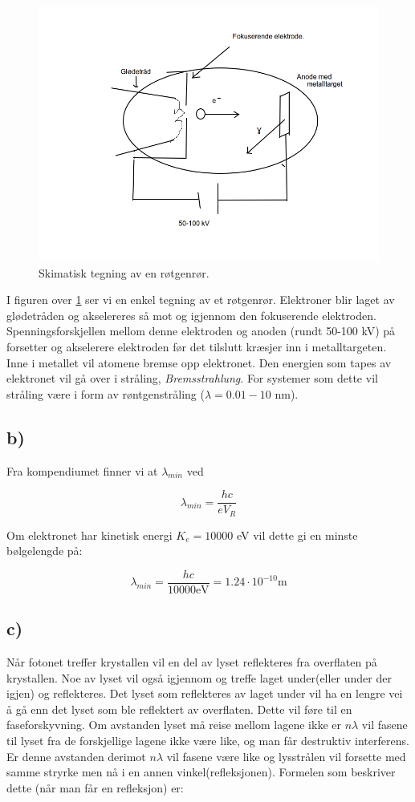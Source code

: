 \documentclass[a4paper,norsk, 10pt]{article}
\begin{document}
\begin{figure}[H]
\centering
\includegraphics[scale=.4]{rontgen.png}
\caption{Skimatisk tegning av en røtgenrør.}\label{img::rontgenror}
\end{figure}

I figuren over \ref{img::rontgenror} ser vi en enkel tegning av et røtgenrør. Elektroner blir laget av glødetråden og akselereres så mot og igjennom den fokuserende elektroden. Spenningsforskjellen mellom denne elektroden og anoden (rundt 50-100 kV) på forsetter og akselerere elektroden før det tilslutt kræsjer inn i metalltargeten. Inne i metallet vil atomene bremse opp elektronet. Den energien som tapes av elektronet vil gå over i stråling, \textit{Bremsstrahlung}. For systemer som dette vil stråling være i form av røntgenstråling ($\lambda = 0.01 - 10$ nm).

\subsection*{b)}
Fra kompendiumet finner vi at $\lambda_{min}$ ved

$$
\lambda_{min}  = \frac{hc}{eV_R}
$$

Om elektronet har kinetisk energi $K_e = 10000$ eV vil dette gi en minste bølgelengde på:

$$
\lambda_{min} =  \frac{hc}{10000 \mathrm{eV}} = 1.24 \cdot 10^{-10} \mathrm{m}
$$

\subsection*{c)}
Når fotonet treffer krystallen vil en del av lyset reflekteres fra overflaten på krystallen. Noe av lyset vil også igjennom og treffe laget under(eller under der igjen) og reflekteres. Det lyset som reflekteres av laget under vil ha en lengre vei å gå enn det lyset som ble reflektert av overflaten. Dette vil føre til en faseforskyvning. Om avstanden lyset må reise mellom lagene ikke er $n\lambda$ vil fasene til lyset fra de forskjellige lagene ikke være like, og man får destruktiv interferens. Er denne avstanden derimot $n\lambda$ vil fasene være like og lysstrålen vil forsette med samme stryrke men nå i en annen vinkel(refleksjonen). Formelen som beskriver dette (når man får en refleksjon) er:
\end{document}
